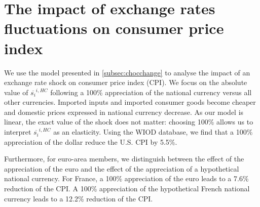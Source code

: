 \documentclass[11pt,a4paper]{article}
\begin{document}
\section{The impact of exchange rates fluctuations on consumer price index}
\label{sec:prixconso}
We use the model presented in \ref{subsec:chocchange} to analyse the impact of an exchange rate shock on consumer price index (CPI).
We focus on the absolute value of $\overline{s_{i}}^{i,HC}$ following a 100\% appreciation of the national currency versus all other currencies. 
Imported inputs and imported consumer goods become cheaper and domestic prices expressed in national currency decrease. 
As our model is linear, the exact value of the shock does not matter: choosing 100\% allows us to interpret $\overline{s_{i}}^{i,HC}$ as an elasticity. 
Using the WIOD database, we find that a 100\% appreciation of the dollar reduce the U.S. CPI by 5.5\%. 

Furthermore, for euro-area members, we distinguish between the effect of the appreciation of the euro and the effect of the appreciation of a hypothetical national currency. 
For France, a 100\% appreciation of the euro leads to a 7.6\% reduction of the CPI. 
A 100\% appreciation of the hypothetical French national currency leads to a 12.2\% reduction of the CPI. 
\end{document}
